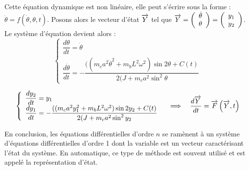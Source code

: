 \documentclass[10pt]{article}
\begin{document}
Cette équation dynamique est non linéaire, elle peut s’écrire sous la forme : $\ddot{\theta}=f(\dot{\theta},\theta,t)$. Posons alors le vecteur d’état $\overrightarrow{Y}$ tel que $\overrightarrow{Y}=\left(\begin{array}{c} \dot{\theta}\\ \theta \end{array}\right) =\left(\begin{array}{c} y_1 \\ y_2 \end{array}\right)$. 
Le système d’équation devient alors :
$$
\left\{\begin{array}{l}
\dfrac{d\theta}{dt} = \dot{\theta} \\
\dfrac{d\dot{\theta}}{dt} = - \dfrac{((m_c a^2 \dot{\theta}^2+m_b L^2 \omega^2 ) \sin 2\theta +C(t)}{2(J+m_c a^2  \sin^2\theta}
\end{array}\right.
$$

$$
\left\{\begin{array}{l}
\dfrac{dy_2}{dt} = y_1 \\
\dfrac{dy_1}{dt} = - \dfrac{((m_c a^2 y_1^2+m_b L^2 \omega^2 ) \sin 2 y_2 +C(t)}{2(J+m_c a^2  \sin^2y_2}
\end{array}\right.
\quad
\Longrightarrow
\quad
\dfrac{d\overrightarrow{Y}}{dt} = \overrightarrow{F}\left(\overrightarrow{Y},t\right)
$$


En conclusion, les équations différentielles d’ordre $n$ se ramènent à un système d’équations différentielles d’ordre 1 dont la variable est un vecteur caractérisant l’état du système. En automatique, ce type de méthode est souvent utilisé et est appelé la représentation d’état.


\begin{thebibliography}{2}
\end{thebibliography}
\end{document}
